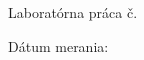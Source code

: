 \makeatletter
\begin{titlepage}
	\begin{center}
		
		\vspace*{100pt}
		
		\begin{spacing}{2.5}
			{\Huge\textbf{\@title}}	
		\end{spacing}	
		
		\vspace*{50pt}
		
		Laboratórna práca č. \labNum
			
	\end{center}

	\vfill

	Dátum merania: \measureDate
	\hfill
	\@author
\end{titlepage}
